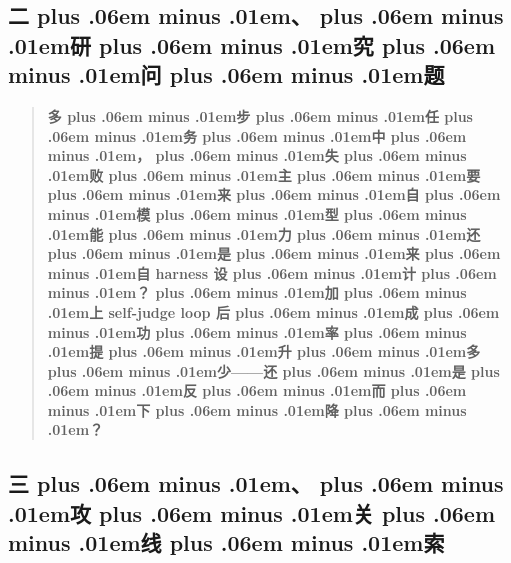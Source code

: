 \documentclass[
]{article}
\def\zh#1{{\zhfont #1}}
\def\zhglue{\hskip0pt plus .06em minus .01em}
\begin{document}
\subsection{\zh{二\zhglue 、\zhglue 研\zhglue 究\zhglue 问\zhglue 题}}\label{ux4e8cux7814ux7a76ux95eeux9898}

\begin{quote}
\textbf{\zh{多\zhglue 步\zhglue 任\zhglue 务\zhglue 中\zhglue ，\zhglue 失\zhglue 败\zhglue 主\zhglue 要\zhglue 来\zhglue 自\zhglue 模\zhglue 型\zhglue 能\zhglue 力\zhglue 还\zhglue 是\zhglue 来\zhglue 自} harness \zh{设\zhglue 计\zhglue ？\zhglue 加\zhglue 上} self-judge loop \zh{后\zhglue 成\zhglue 功\zhglue 率\zhglue 提\zhglue 升\zhglue 多\zhglue 少}------\zh{还\zhglue 是\zhglue 反\zhglue 而\zhglue 下\zhglue 降\zhglue ？}}
\end{quote}

\subsection{\zh{三\zhglue 、\zhglue 攻\zhglue 关\zhglue 线\zhglue 索}}\label{ux4e09ux653bux5173ux7ebfux7d22}
\end{document}

